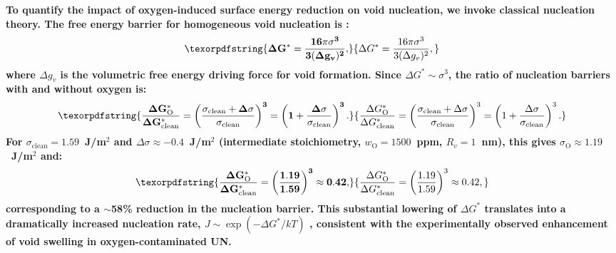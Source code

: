 \documentclass[preprint,12pt,sort&compress]{elsarticle}
\newcommand{\?}{\stackrel{?}{=}}
\providecommand{\DIFaddtex}[1]{{\bf #1}} %
\providecommand{\DIFaddbegin}{\protect\color{blue}} %
\providecommand{\DIFaddend}{\protect\color{black}} %
\providecommand{\DIFadd}[1]{\texorpdfstring{\DIFaddtex{#1}}{#1}} %
\newcommand{\DIFaddincludegraphics}[2][]{{\color{blue}\fbox{\DIFOincludegraphics[#1]{#2}}}} %
\DeclareRobustCommand{\DIFaddbegin}{\DIFOaddbegin \let\includegraphics\DIFaddincludegraphics} %
\DeclareRobustCommand{\DIFaddend}{\DIFOaddend \let\includegraphics\DIFOincludegraphics} %
\begin{document}
\DIFaddbegin \DIFadd{To quantify the impact of oxygen-induced surface energy reduction on void nucleation, we invoke classical nucleation theory. The free energy barrier for homogeneous void nucleation is \cite{Fultz2020}:
}\begin{equation}
\DIFadd{\Delta G^* = \frac{16 \pi \sigma^3}{3 (\Delta g_v)^2},
}\end{equation}
\DIFadd{where $\Delta g_v$ is the volumetric free energy driving force for void formation. Since $\Delta G^* \sim \sigma^3$, the ratio of nucleation barriers with and without oxygen is:
}\begin{equation}
\DIFadd{\frac{\Delta G^*_\text{O}}{\Delta G^*_\text{clean}} = \left( \frac{\sigma_\text{clean} + \Delta \sigma}{\sigma_\text{clean}} \right)^3 = \left( 1 + \frac{\Delta \sigma}{\sigma_\text{clean}} \right)^3.
}\end{equation}
\DIFadd{For $\sigma_\text{clean} = 1.59$~J/m$^2$ and $\Delta \sigma \approx -0.4$~J/m$^2$ (intermediate stoichiometry, $w_\text{O} = 1500$~ppm, $R_v = 1$~nm), this gives $\sigma_\text{O} \approx 1.19$~J/m$^2$ and:
}\begin{equation}
\DIFadd{\frac{\Delta G^*_\text{O}}{\Delta G^*_\text{clean}} = \left( \frac{1.19}{1.59} \right)^3 \approx 0.42,
}\end{equation}
\DIFadd{corresponding to a $\sim$58\% reduction in the nucleation barrier. This substantial lowering of $\Delta G^*$ translates into a dramatically increased nucleation rate, $J \sim \exp(-\Delta G^*/kT)$ \cite{Fultz2020}, consistent with the experimentally observed enhancement of void swelling in oxygen-contaminated UN.
}

\DIFaddend %
\end{document}
